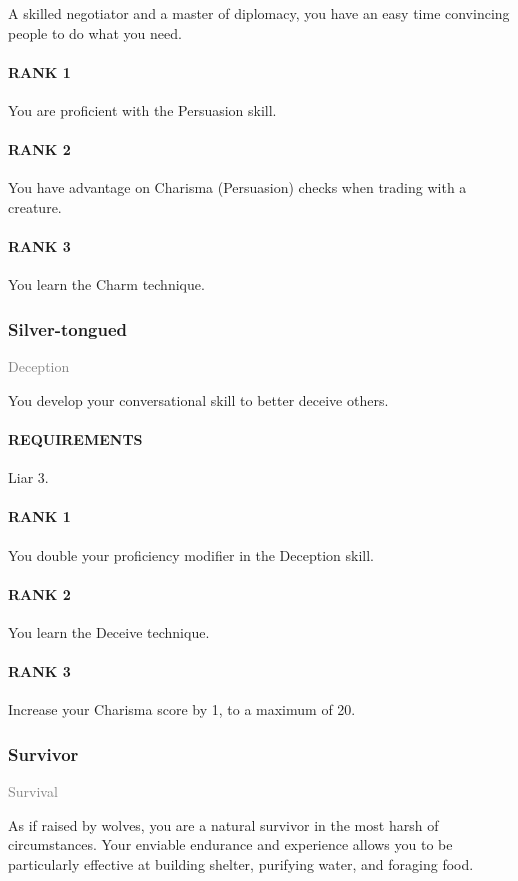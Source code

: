 \normalsize
A skilled negotiator and a master of diplomacy, you have an easy time convincing people to do what you need.
\paragraph{RANK 1} You are proficient with the Persuasion skill.
\paragraph{RANK 2} You have advantage on Charisma (Persuasion) checks when trading with a creature.
\paragraph{RANK 3} You learn the Charm technique.

\subsubsection{Silver-tongued} \label{feat::silvertongued}
\small{\textcolor{gray}{Deception}}

\normalsize
You develop your conversational skill to better deceive others.
\paragraph{REQUIREMENTS} Liar 3.
\paragraph{RANK 1} You double your proficiency modifier in the Deception skill.
\paragraph{RANK 2} You learn the Deceive technique.
\paragraph{RANK 3} Increase your Charisma score by 1, to a maximum of 20.

\subsubsection{Survivor} \label{feat::survivor}
\small{\textcolor{gray}{Survival}}

\normalsize
As if raised by wolves, you are a natural survivor in the most harsh of circumstances.
Your enviable endurance and experience allows you to be particularly effective at building shelter, purifying water, and foraging food.
